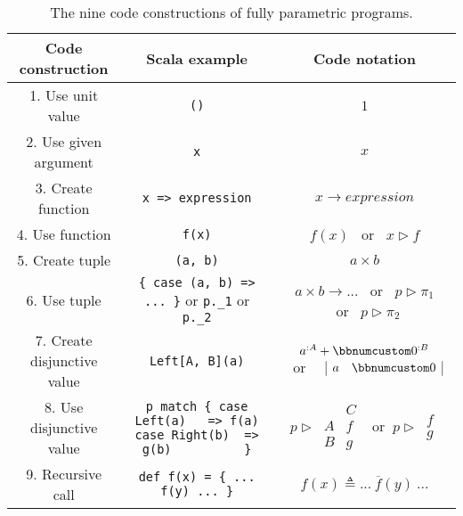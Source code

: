 \begin{table}
\begin{centering}
\begin{tabular}{|c|c|c|}
\hline 
\textbf{\small{}Code construction} & \textbf{\small{}Scala example} & \textbf{\small{}Code notation}\tabularnewline
\hline 
\hline 
{\small{}1. Use unit value} & {\small{}}\lstinline!()! & {\small{}$1$}\tabularnewline
\hline 
{\small{}2. Use given argument} & {\small{}}\lstinline!x! & {\small{}$x$}\tabularnewline
\hline 
{\small{}3. Create function} & {\small{}}\lstinline!x => expression! & {\small{}$x\rightarrow expression$}\tabularnewline
\hline 
{\small{}4. Use function} & {\small{}}\lstinline!f(x)! & $f(x)$ ~or~ $x\triangleright f$\tabularnewline
\hline 
{\small{}5. Create tuple} & {\small{}}\lstinline!(a, b)! & {\small{}$a\times b$}\tabularnewline
\hline 
{\small{}6. Use tuple} & {\small{}}\lstinline!{ case (a, b) => ... }!{\small{} or }\lstinline!p._1!{\small{}
or }\lstinline!p._2!{\small{} } & {\small{}$a\times b\rightarrow...$ ~or~ $p\triangleright\pi_{1}$
~or~ $p\triangleright\pi_{2}$}\tabularnewline
\hline 
{\small{}7. Create disjunctive value} & {\small{}}\lstinline!Left[A, B](a)! & {\small{}}%
\begin{minipage}[c]{0.19\columnwidth}%
{\small{}\vspace{0.2\baselineskip}
$a^{:A}+\bbnum 0^{:B}$ ~or~~ $\begin{array}{|cc|}
a & \bbnum 0\end{array}$\vspace{0.2\baselineskip}
}%
\end{minipage}\tabularnewline
\hline 
{\small{}8. Use disjunctive value} & {\small{}}%
\begin{minipage}[c]{0.33\columnwidth}%
{\small{}}\lstinline!p match { case Left(a)   => f(a)            case Right(b)  => g(b)          }!%
\end{minipage} & {\small{}}%
\begin{minipage}[c]{0.23\columnwidth}%
{\small{}\vspace{0.2\baselineskip}
$p\triangleright\,\begin{array}{|c||c|}
 & C\\
\hline A & f\\
B & g
\end{array}\,~\text{ or }~p\triangleright\,\begin{array}{||c|}
f\\
g
\end{array}$\vspace{0.2\baselineskip}
}%
\end{minipage}\tabularnewline
\hline 
{\small{}9. Recursive call} & {\small{}}\lstinline!def f(x) = { ... f(y) ... }! & {\small{}$f(x)\triangleq...~\overline{f}(y)~...$}\tabularnewline
\hline 
\end{tabular}
\par\end{centering}
\caption{The nine code constructions
of fully parametric programs.\label{tab:nine-pure-code-constructions}}
\end{table}

